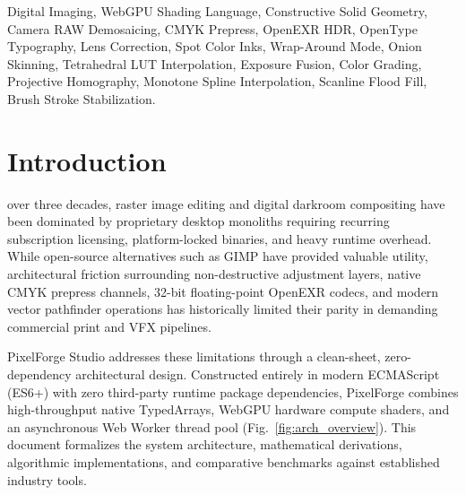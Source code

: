 \documentclass[10pt,journal,compsoc]{IEEEtran}
\begin{document}
{\begin{abstract}
\end{abstract}

\begin{IEEEkeywords}
Digital Imaging, WebGPU Shading Language, Constructive Solid Geometry, Camera RAW Demosaicing, CMYK Prepress, OpenEXR HDR, OpenType Typography, Lens Correction, Spot Color Inks, Wrap-Around Mode, Onion Skinning, Tetrahedral LUT Interpolation, Exposure Fusion, Color Grading, Projective Homography, Monotone Spline Interpolation, Scanline Flood Fill, Brush Stroke Stabilization.
\end{IEEEkeywords}}

\maketitle
\IEEEdisplaynontitleabstractindextext
\IEEEpeerreviewmaketitle

\section{Introduction}
 over three decades, raster image editing and digital darkroom compositing have been dominated by proprietary desktop monoliths requiring recurring subscription licensing, platform-locked binaries, and heavy runtime overhead. While open-source alternatives such as GIMP have provided valuable utility, architectural friction surrounding non-destructive adjustment layers, native CMYK prepress channels, 32-bit floating-point OpenEXR codecs, and modern vector pathfinder operations has historically limited their parity in demanding commercial print and VFX pipelines.

PixelForge Studio addresses these limitations through a clean-sheet, zero-dependency architectural design. Constructed entirely in modern ECMAScript (ES6+) with zero third-party runtime package dependencies, PixelForge combines high-throughput native TypedArrays, WebGPU hardware compute shaders, and an asynchronous Web Worker thread pool (Fig.~\ref{fig:arch_overview}). This document formalizes the system architecture, mathematical derivations, algorithmic implementations, and comparative benchmarks against established industry tools.
\end{document}
